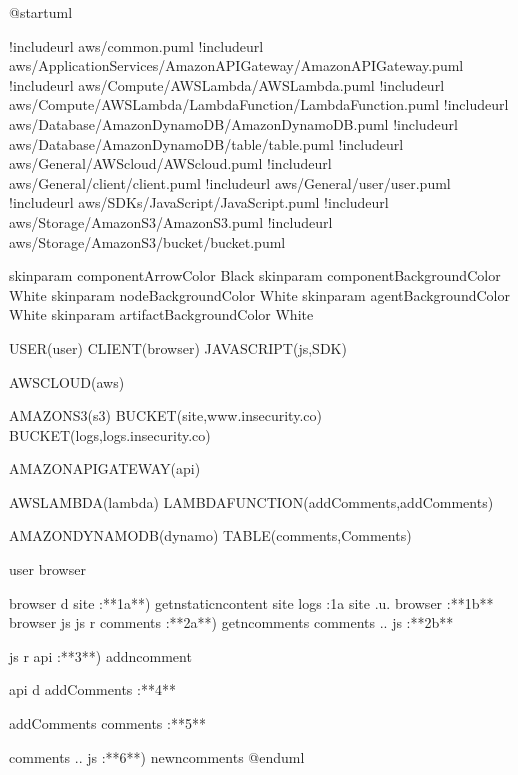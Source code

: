 \documentclass[letterpaper,10pt,english]{sphinxmanual}
\begin{document}
\begin{sphinxVerbatim}[commandchars=\\\{\},numbers=left,firstnumber=1,stepnumber=1]
@startuml


!includeurl \PYGZlt{}aws/common.puml\PYGZgt{}
!includeurl \PYGZlt{}aws/ApplicationServices/AmazonAPIGateway/AmazonAPIGateway.puml\PYGZgt{}
!includeurl \PYGZlt{}aws/Compute/AWSLambda/AWSLambda.puml\PYGZgt{}
!includeurl \PYGZlt{}aws/Compute/AWSLambda/LambdaFunction/LambdaFunction.puml\PYGZgt{}
!includeurl \PYGZlt{}aws/Database/AmazonDynamoDB/AmazonDynamoDB.puml\PYGZgt{}
!includeurl \PYGZlt{}aws/Database/AmazonDynamoDB/table/table.puml\PYGZgt{}
!includeurl \PYGZlt{}aws/General/AWScloud/AWScloud.puml\PYGZgt{}
!includeurl \PYGZlt{}aws/General/client/client.puml\PYGZgt{}
!includeurl \PYGZlt{}aws/General/user/user.puml\PYGZgt{}
!includeurl \PYGZlt{}aws/SDKs/JavaScript/JavaScript.puml\PYGZgt{}
!includeurl \PYGZlt{}aws/Storage/AmazonS3/AmazonS3.puml\PYGZgt{}
!includeurl \PYGZlt{}aws/Storage/AmazonS3/bucket/bucket.puml\PYGZgt{}

skinparam componentArrowColor Black
skinparam componentBackgroundColor White
skinparam nodeBackgroundColor White
skinparam agentBackgroundColor White
skinparam artifactBackgroundColor White


USER(user)
CLIENT(browser)
JAVASCRIPT(js,SDK)

AWSCLOUD(aws) \PYGZob{}

    AMAZONS3(s3) \PYGZob{}
        BUCKET(site,www.insecurity.co)
        BUCKET(logs,logs.insecurity.co)
    \PYGZcb{}

    AMAZONAPIGATEWAY(api)

    AWSLAMBDA(lambda) \PYGZob{}
        LAMBDAFUNCTION(addComments,addComments)
    \PYGZcb{}

    AMAZONDYNAMODB(dynamo) \PYGZob{}
        TABLE(comments,Comments)
    \PYGZcb{}
\PYGZcb{}

user \PYGZhy{} browser

browser \PYGZhy{}d\PYGZhy{}\PYGZgt{} site :**1a**) get\PYGZbs{}nstatic\PYGZbs{}ncontent
site \PYGZti{}\PYGZgt{} logs :1a
site .u.\PYGZgt{} browser :**1b**
browser \PYGZhy{} js
js \PYGZhy{}r\PYGZhy{}\PYGZgt{} comments :**2a**) get\PYGZbs{}ncomments
comments ..\PYGZgt{} js :**2b**

js \PYGZhy{}r\PYGZhy{}\PYGZgt{} api :**3**) add\PYGZbs{}ncomment

api \PYGZhy{}d\PYGZhy{}\PYGZgt{} addComments :**4**

addComments \PYGZhy{}\PYGZgt{} comments :**5**

comments ..\PYGZgt{} js :**6**) new\PYGZbs{}ncomments
@enduml
\end{sphinxVerbatim}
\end{document}
